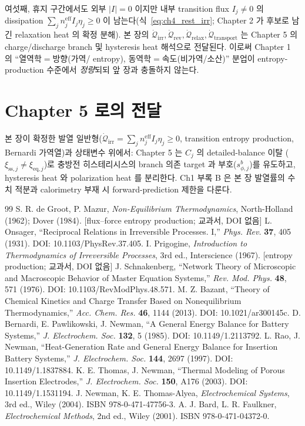 \documentclass[11pt,a4paper]{article}
\newcommand{\eff}{\mathrm{eff}}
\newcommand{\eq}{\mathrm{eq}}
\newcommand{\irr}{\mathrm{irr}}
\newcommand{\rev}{\mathrm{rev}}
\newcommand{\rlx}{\mathrm{relax}}
\newcommand{\transp}{\mathrm{transport}}
\newcommand{\sstat}{\mathrm{ss}}
\newcommand{\brk}{\discretionary{}{}{}}%
\begin{document}
여섯째, 휴지 구간에서도 외부 $|I|=0$ 이지만 내부 transition flux $I_j\ne0$ 의 dissipation $\sum_j n_j^{\eff}I_j\eta_j\ge0$
이 남는다(식~\eqref{eq:ch4_rest_irr}; Chapter 2 가 후보로 남긴 relaxation heat 의 확정 분해). 본 장의
$\dot{\mathcal Q}_{\irr},\dot{\mathcal Q}_{\rev},\dot{\mathcal Q}_{\rlx},\dot{\mathcal Q}_{\transp}$ 는 Chapter 5
의 charge/discharge branch 및 hysteresis heat 해석으로 전달된다. 이로써 Chapter 1 의 ``열역학$=$방향(가역/
entropy), 동역학$=$속도(비가역/소산)'' 분업이 entropy-production 수준에서 \emph{정량}되되 앞 장과 충돌하지 않는다.

\section*{Chapter 5 로의 전달}
본 장이 확정한 발열 일반형($\dot{\mathcal Q}_\irr=\sum_j n_j^{\eff}I_j\eta_j\ge0$, transition entropy
production, Bernardi 가역열)과 상태변수 위에서: Chapter 5 는 $C_j$ 의 detailed-balance 이탈
($\xi_{\sstat,j}\ne\xi_{\eq,j}$)로 충방전 히스테리시스의 branch 의존 target 과 부호($s_{\phi,j}^b$)를 유도하고,
hysteresis heat 와 polarization heat 를 분리한다. Ch1 부록 B 은 본 장 발열률의 수치 적분과 calorimetry 부재 시
forward-prediction 제한을 다룬다.

\begin{thebibliography}{99}
 S. R. de Groot, P. Mazur, \emph{Non-Equilibrium Thermodynamics},
  North-Holland (1962); Dover (1984). [flux--force entropy production; 교과서, DOI 없음]
 L. Onsager, ``Reciprocal Relations in Irreversible Processes. I,'' \emph{Phys. Rev.}
  \textbf{37}, 405 (1931). DOI: 10.1103/\brk PhysRev.37.405.
 I. Prigogine, \emph{Introduction to Thermodynamics of Irreversible Processes},
  3rd ed., Interscience (1967). [entropy production; 교과서, DOI 없음]
 J. Schnakenberg, ``Network Theory of Microscopic and Macroscopic Behavior of
  Master Equation Systems,'' \emph{Rev. Mod. Phys.} \textbf{48}, 571 (1976). DOI: 10.1103/\brk RevModPhys.48.571.
 M. Z. Bazant, ``Theory of Chemical Kinetics and Charge Transfer Based on
  Nonequilibrium Thermodynamics,'' \emph{Acc. Chem. Res.} \textbf{46}, 1144 (2013). DOI: 10.1021/\brk ar300145c.
 D. Bernardi, E. Pawlikowski, J. Newman, ``A General Energy Balance for Battery
  Systems,'' \emph{J. Electrochem. Soc.} \textbf{132}, 5 (1985). DOI: 10.1149/\brk 1.2113792.
 L. Rao, J. Newman, ``Heat-Generation Rate and General Energy Balance for Insertion
  Battery Systems,'' \emph{J. Electrochem. Soc.} \textbf{144}, 2697 (1997). DOI: 10.1149/\brk 1.1837884.
 K. E. Thomas, J. Newman, ``Thermal Modeling of Porous Insertion Electrodes,''
  \emph{J. Electrochem. Soc.} \textbf{150}, A176 (2003). DOI: 10.1149/\brk 1.1531194.
 J. Newman, K. E. Thomas-Alyea, \emph{Electrochemical Systems}, 3rd ed., Wiley (2004).
  ISBN 978-0-\brk 471-47756-3.
 A. J. Bard, L. R. Faulkner, \emph{Electrochemical Methods}, 2nd ed., Wiley (2001).
  ISBN 978-0-\brk 471-04372-0.
\end{thebibliography}
\end{document}
